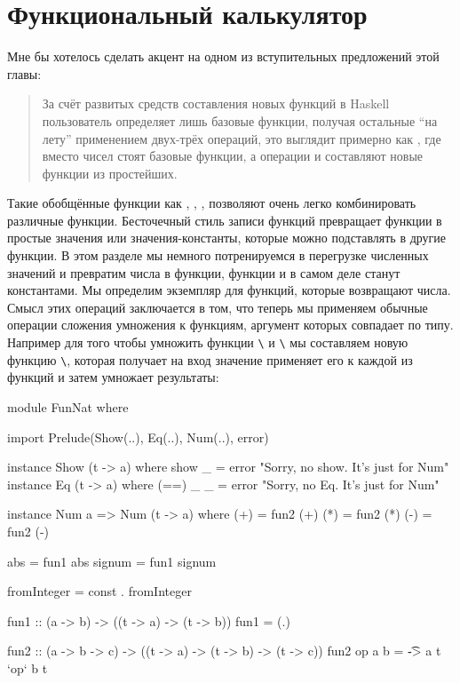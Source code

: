 \section{Функциональный калькулятор}

Мне бы хотелось сделать акцент на одном из вступительных предложений
этой главы:

\begin{quote}
За счёт развитых средств составления новых функций в Haskell
пользователь определяет лишь базовые функции, получая остальные ``на
лету'' применением двух-трёх операций, это выглядит примерно как
, где вместо чисел стоят базовые функции, а операции \In{+}
и \In{*} составляют новые функции из простейших.
\end{quote}

Такие обобщённые функции как , , , 
 позволяют очень легко комбинировать различные функции.
Бесточечный стиль записи функций превращает функции в простые значения
или значения-константы, которые можно подставлять в другие функции. В
этом разделе мы немного потренируемся в перегрузке численных значений и
превратим числа в функции, функции и в самом деле станут константами. Мы
определим экземпляр  для функций, которые возвращают числа.
Смысл этих операций заключается в том, что теперь мы применяем обычные
операции сложения умножения к функциям, аргумент которых совпадает по
типу. Например для того чтобы умножить функции
\In{}\verb!\! и \In{}\verb!\! мы составляем
новую функцию \In{}\verb!\!, которая получает на
вход значение  применяет его к каждой из функций и затем умножает
результаты:


\begin{code}
module FunNat where

import Prelude(Show(..), Eq(..), Num(..), error)

instance Show (t -> a) where
    show _ = error "Sorry, no show. It's just for Num"
instance Eq (t -> a) where
    (==) _ _ = error "Sorry, no Eq. It's just for Num"

instance Num a => Num (t -> a) where
    (+) = fun2 (+)
    (*) = fun2 (*)
    (-) = fun2 (-)

    abs      = fun1 abs
    signum   = fun1 signum

    fromInteger = const . fromInteger

fun1 :: (a -> b) -> ((t -> a) -> (t -> b))
fun1 = (.)

fun2 :: (a -> b -> c) -> ((t -> a) -> (t -> b) -> (t -> c))
fun2 op a b = \t -> a t `op` b t
\end{code}

